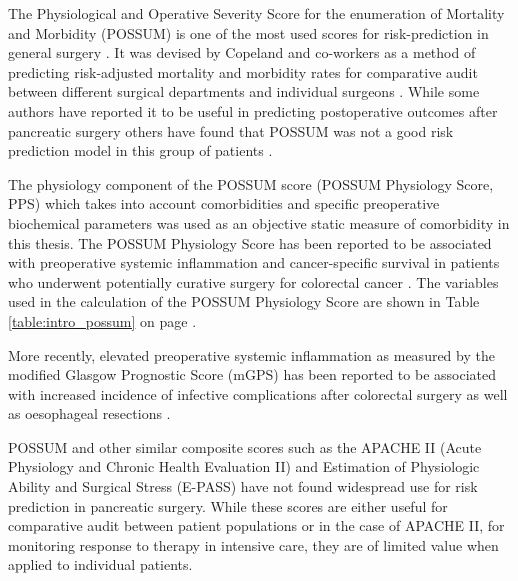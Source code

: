 The Physiological and Operative Severity Score for the enumeration of Mortality and Morbidity (POSSUM) is one of the most used scores for risk-prediction in general surgery \parencite{copeland_possum:_1991}.
It was devised by Copeland and co-workers as a method of predicting risk-adjusted mortality and morbidity rates for comparative audit between different surgical departments \parencite{copeland_comparative_1993} and individual surgeons \parencite{copeland_risk-adjusted_1995}.
While some authors have reported it to be useful in predicting postoperative outcomes after pancreatic surgery \parencite{pratt_possum_2008} others have found that POSSUM was not a good risk prediction model in this group of patients \parencite{khan_evaluation_2003, kocher_risk-adjustment_2005, tamijmarane_application_2008, de_castro_evaluation_2009}.

The physiology component of the POSSUM score (POSSUM Physiology Score, PPS) which takes into account comorbidities and specific preoperative biochemical parameters was used as an objective static measure of comorbidity in this thesis. 
The POSSUM Physiology Score has been reported to be associated with preoperative systemic inflammation and cancer-specific survival in patients who underwent potentially curative surgery for colorectal cancer \parencite{richards_relationship_2010}.
The variables used in the calculation of the POSSUM Physiology Score are shown in Table \ref{table:intro_possum} on page \pageref{table:intro_possum}.



More recently, elevated preoperative systemic inflammation as measured by the modified Glasgow Prognostic Score (mGPS) has been reported to be associated with increased incidence of infective complications after colorectal surgery \parencite{moyes_preoperative_2009} as well as oesophageal resections \parencite{vashist_glasgow_2010}.

POSSUM and other similar composite scores such as the APACHE II (Acute Physiology and Chronic Health Evaluation II) \parencite{knaus_apache_1985} and Estimation of Physiologic Ability and Surgical Stress (E-PASS)  \parencite{haga_estimation_1999, hashimoto_is_2010} have not found widespread use for risk prediction in pancreatic surgery.
While these scores are either useful for comparative audit between patient populations or in the case of APACHE II, for monitoring response to therapy in intensive care, they are of limited value when applied to individual patients.

